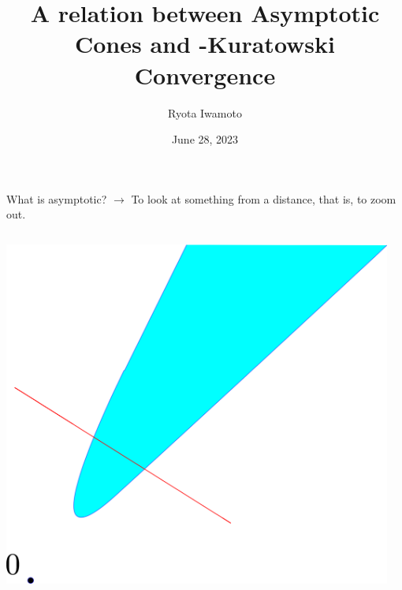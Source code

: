 \documentclass[aspectratio=169, dvipdfmx, 11pt]{beamer} %
\title[Relation of asymptotic cone]{A relation between Asymptotic Cones and \Painleve-Kuratowski Convergence}
\author[Ryota Iwamoto]{Ryota Iwamoto}
\institute[Niigata Univ]{Niigata Univ}
\date{June 28, 2023}
\begin{document}
\maketitle

\begin{frame}{What is asymptotic?}
    \pause
    $\rightarrow$ To look at something from a distance, that is, to zoom out.

    \medskip

    \centering
        \begin{columns}
            \pause
            \begin{column}{0.48\textwidth}
            \centering
            \includegraphics[keepaspectratio, scale=0.095]{figures/asymptotic_meaning_1.eps}
            \end{column}
            \pause
            \begin{column}{0.48\textwidth}
            \centering

\end{column}
\end{columns}
\end{frame}
\end{document}

